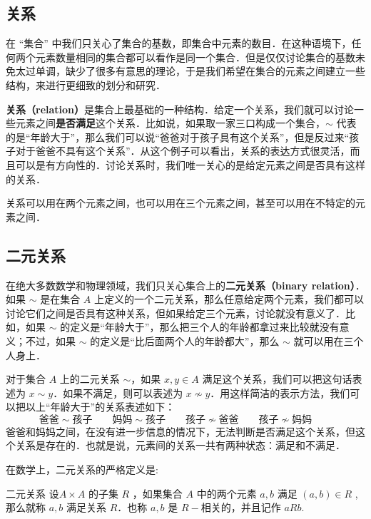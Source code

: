 

\subsection{关系}

在 “集合” 中我们只关心了集合的基数，即集合中元素的数目．在这种语境下，任何两个元素数量相同的集合都可以看作是同一个集合．但是仅仅讨论集合的基数未免太过单调，缺少了很多有意思的理论，于是我们希望在集合的元素之间建立一些结构，来进行更细致的划分和研究．

\textbf{关系（relation）}是集合上最基础的一种结构．给定一个关系，我们就可以讨论一些元素之间\textbf{是否满足}这个关系．比如说，如果取一家三口构成一个集合，$\sim$ 代表的是“年龄大于”，那么我们可以说“爸爸对于孩子具有这个关系”，但是反过来“孩子对于爸爸不具有这个关系”．从这个例子可以看出，关系的表达方式很灵活，而且可以是有方向性的．讨论关系时，我们唯一关心的是给定元素之间是否具有这样的关系．

关系可以用在两个元素之间，也可以用在三个元素之间，甚至可以用在不特定的元素之间．

\subsection{二元关系}\label{Relat_sub3}

在绝大多数数学和物理领域，我们只关心集合上的\textbf{二元关系（binary relation）}．如果 $\sim$ 是在集合 $A$ 上定义的一个二元关系，那么任意给定两个元素，我们都可以讨论它们之间是否具有这种关系，但如果给定三个元素，讨论就没有意义了．比如，如果 $\sim$ 的定义是“年龄大于”，那么把三个人的年龄都拿过来比较就没有意义；不过，如果 $\sim$ 的定义是“比后面两个人的年龄都大”，那么 $\sim$ 就可以用在三个人身上．

对于集合 $A$ 上的二元关系 $\sim$，如果 $x, y\in A$ 满足这个关系，我们可以把这句话表述为 $x\sim y$．如果不满足，则可以表述为 $x\not\sim y$．用这样简洁的表示方法，我们可以把以上“年龄大于”的关系表述如下：
\begin{equation}
\text{爸爸}\sim\text{孩子} \qquad
\text{妈妈}\sim\text{孩子} \qquad
\text{孩子}\not\sim\text{爸爸} \qquad
\text{孩子}\not\sim\text{妈妈} \qquad
\end{equation}
爸爸和妈妈之间，在没有进一步信息的情况下，无法判断是否满足这个关系，但这个关系是存在的．也就是说，元素间的关系一共有两种状态：满足和不满足．

在数学上，二元关系的严格定义是:
\begin{definition}{二元关系}
设$A \times A$ 的子集 $R$ ，如果集合 $A$ 中的两个元素 $a,b$ 满足 $(a,b) \in R$ ,那么就称 $a,b$ 满足关系 $R$．也称 $a,b$ 是 $R-$相关的，并且记作 $aRb$.
\end{definition}

